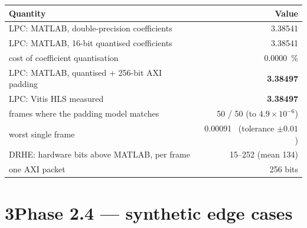 \documentclass[10pt,a4paper]{article}
\newcommand{\tno}[1]{\textbf{#1}}
\begin{document}
\begin{center}
\begin{minipage}{0.98\textwidth}\centering
{}
\centering\small
\begin{tabular}{@{}lr@{}}
\toprule
Quantity & Value\\
\midrule
LPC: MATLAB, double-precision coefficients      & \num{3.38541}\\
LPC: MATLAB, 16-bit quantised coefficients      & \num{3.38541}\\
\quad cost of coefficient quantisation          & \SI{0.0000}{\percent}\\
LPC: MATLAB, quantised + 256-bit AXI padding    & \tno{\num{3.38497}}\\
LPC: Vitis HLS measured                         & \tno{\num{3.38497}}\\
\quad frames where the padding model matches    & \num{50} / \num{50} (to $4.9\times10^{-6}$)\\
\quad worst single frame                        & \num{0.00091} \ (tolerance $\pm 0.01$)\\
\midrule
DRHE: hardware bits above MATLAB, per frame     & \num{15}--\num{252} (mean \num{134})\\
\quad one AXI packet                            & \num{256} bits\\
\bottomrule
\end{tabular}
\end{minipage}
\end{center}

\section{3\quad Phase 2.4 --- synthetic edge cases}
\end{document}
